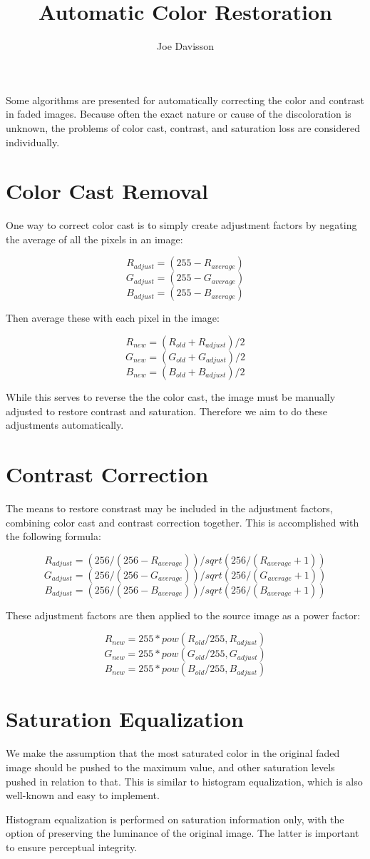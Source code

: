 \documentclass{article}
\title{Automatic Color Restoration}
\author{Joe Davisson} %
\begin{document}
\maketitle

Some algorithms are presented for automatically correcting the
color and contrast in faded images. Because often the exact nature or cause
of the discoloration is unknown, the problems of color cast, contrast, and
saturation loss are considered individually.

\section{Color Cast Removal}

One way to correct color cast is to simply create adjustment factors by
negating the average of all the pixels in an image:

\[ R_{adjust} = (255 - R_{average}) \]
\[ G_{adjust} = (255 - G_{average}) \]
\[ B_{adjust} = (255 - B_{average}) \]

Then average these with each pixel in the image:

\[ R_{new} = (R_{old} + R_{adjust}) / 2 \]
\[ G_{new} = (G_{old} + G_{adjust}) / 2 \]
\[ B_{new} = (B_{old} + B_{adjust}) / 2 \]

While this serves to reverse the the color cast, the image must be manually
adjusted to restore contrast and saturation. Therefore we aim to do these
adjustments automatically.

\section{Contrast Correction}

The means to restore constrast may be included in the adjustment factors,
combining color cast and contrast correction together. This is accomplished
with the following formula:

\[ R_{adjust} = (256 / (256 - R_{average})) / sqrt(256 / (R_{average} + 1)) \]
\[ G_{adjust} = (256 / (256 - G_{average})) / sqrt(256 / (G_{average} + 1)) \]
\[ B_{adjust} = (256 / (256 - B_{average})) / sqrt(256 / (B_{average} + 1)) \]

These adjustment factors are then applied to the source image as a power factor:

\[ R_{new} = 255 * pow(R_{old} / 255, R_{adjust}) \]
\[ G_{new} = 255 * pow(G_{old} / 255, G_{adjust}) \]
\[ B_{new} = 255 * pow(B_{old} / 255, B_{adjust}) \]

\section{Saturation Equalization}

We make the assumption that the most saturated color in the original faded
image should be pushed to the maximum value, and other saturation levels pushed in relation to that. This is similar to histogram equalization, which is also
well-known and easy to implement.

Histogram equalization is performed on saturation information only, with the option of preserving the luminance of the original image. The latter is important to ensure perceptual integrity.
\end{document}
